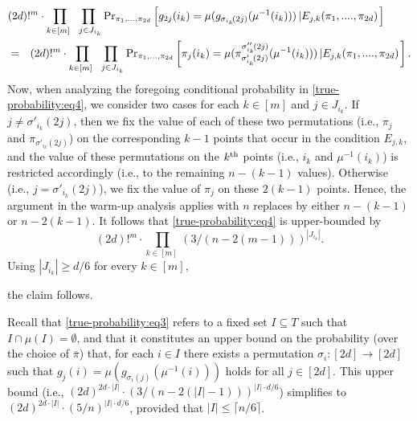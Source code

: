 \documentclass[10pt,a4paper]{article}
\theoremstyle{definition}
\newcommand{\prob}{{\rm Pr}}
\newcommand{\xth}{{\rm th}}
\newcommand{\imu}{{\mu^{-1}}}
\newcommand{\ceil}[1]{{\lceil#1\rceil}}
\newcommand{\ov}{\overline}
\begin{document}
%
%
%
\begin{eqnarray}
\lefteqn{(2d)!^{m}\cdot\prod_{k\in[m]~} \prod_{~j\in J_{i_k}}
     \prob_{\pi_1,\ldots,\pi_{2d}}
          \left[g_{2j}(i_k)=\mu(g_{\sigma_{i_k}\!(2j)}(\imu(i_k)))\left|
                E_{j,k}(\pi_1,....,\pi_{2d}) \right.\right]}
\nonumber \\
&=& (2d)!^{m}\cdot\prod_{k\in[m]~} \prod_{~j\in J_{i_k}}
     \prob_{\pi_1,\ldots,\pi_{2d}}
          \left[\pi_{j}(i_k)
      =\mu(\pi^{\sigma''_{i_k}\!(2j)}_{\sigma'_{i_k}\!(2j)}
	  (\imu(i_k)))\left|E_{j,k}(\pi_1,....,\pi_{2d}) \right.\right] .
\label{true-probability:eq4}
%
%
\end{eqnarray}
%
%
%
%
%
%
%
%
%
%
%
%
%
%
Now, when analyzing the foregoing conditional probability
in \eqref{true-probability:eq4},
we consider two cases for each $k\in[m]$ and $j\in J_{i_k}$.
If $j\neq\sigma'_{i_k}\!(2j)$, then
%
we fix the value of each of these two permutations
(i.e., $\pi_j$ and $\pi_{\sigma'_{i_k}\!(2j)}$)
on the corresponding $k-1$ points that occur in the condition $E_{j,k}$,
and the value of these permutations on the $k^\xth$ points
(i.e., $i_k$ and $\imu(i_k)$) is restricted accordingly
(i.e., to the remaining $n-(k-1)$ values).
%
Otherwise (i.e., $j=\sigma'_{i_k}\!(2j)$),
we fix the value of $\pi_j$ on these $2(k-1)$ points.
Hence, the argument in the warm-up analysis applies with $n$
replaces by either $n-(k-1)$ or $n-2(k-1)$.
It follows that \eqref{true-probability:eq4} is upper-bounded by
$$(2d)!^{m}\cdot\prod_{k\in[m]~}(3/(n-2(m-1)))^{|J_{i_k}|}.$$
Using $|J_{i_k}|\geq d/6$ for every $k\in[m]$,

the claim follows.
\Epf



\medskip

Recall that \eqref{true-probability:eq3} refers to
a fixed set $I\subseteq T$ such that $I\cap\mu(I)=\emptyset$,
and that it constitutes an upper bound
on the probability (over the choice of $\ov\pi$)
that, for each $i\in I$ there exists
a permutation $\sigma_i:[2d]\to[2d]$
such that $g_j(i)=\mu(g_{\sigma_i(j)}(\imu(i)))$
holds for all $j\in[2d]$.
This upper bound
(i.e., $(2d)^{2d\cdot|I|}\cdot(3/(n-2(|I|-1)))^{|I|\cdot d/6}$)
simplifies to $(2d)^{2d\cdot|I|}\cdot(5/n)^{|I|\cdot d/6}$,
provided that $|I|\leq\ceil{n/6}$.

%
%
%
%
%
%
%
\end{document}
